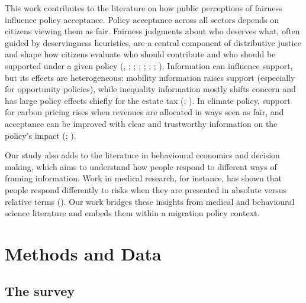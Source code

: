 \documentclass[
  12pt,
  a4paper,
]{article}
\begin{document}
This work contributes to the literature on how public perceptions of fairness influence policy acceptance. Policy acceptance across all sectors depends on citizens viewing them as fair. Fairness judgments about who deserves what, often guided by deservingness heuristics, are a central component of distributive justice and shape how citizens evaluate who should contribute and who should be supported under a given policy (, ; ; ; ; ; ; ). Information can influence support, but its effects are heterogeneous: mobility information raises support (especially for opportunity policies), while inequality information mostly shifts concern and has large policy effects chiefly for the estate tax (; ). In climate policy, support for carbon pricing rises when revenues are allocated in ways seen as fair, and acceptance can be improved with clear and trustworthy information on the policy's impact (; ).

Our study also adds to the literature in behavioural economics and decision making, which aims to understand how people respond to different ways of framing information. Work in medical research, for instance, has shown that people respond differently to risks when they are presented in absolute versus relative terms (). Our work bridges these insights from medical and behavioural science literature and embeds them within a migration policy context.

\section{Methods and Data}\label{methods-and-data}

\subsection{The survey}\label{the-survey}
\end{document}
